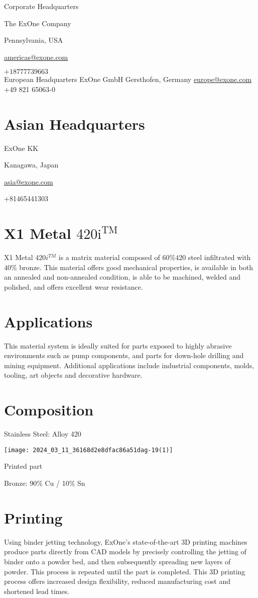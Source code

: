 \documentclass[10pt]{article}
\begin{document}
Corporate Headquarters

The ExOne Company

Pennsylvania, USA

\href{mailto:americas@exone.com}{americas@exone.com}

$+18777739663$\\
European Headquarters ExOne GmbH Gersthofen, Germany \href{mailto:europe@exone.com}{europe@exone.com} +49 821 65063-0

\section*{Asian Headquarters}
ExOne KK

Kanagawa, Japan

\href{mailto:asia@exone.com}{asia@exone.com}

+81465441303

\section*{X1 Metal $420 \mathrm{i}^{\mathrm{TM}}$}
X1 Metal $420 i^{T M}$ is a matrix material composed of $60 \% 420$ steel infiltrated with $40 \%$ bronze. This material offers good mechanical properties, is available in both an annealed and non-annealed condition, is able to be machined, welded and polished, and offers excellent wear resistance.

\section*{Applications}
This material system is ideally suited for parts exposed to highly abrasive environments such as pump components, and parts for down-hole drilling and mining equipment. Additional applications include industrial components, molds, tooling, art objects and decorative hardware.

\section*{Composition}
Stainless Steel: Alloy 420

\begin{center}
\texttt{[image: 2024\_03\_11\_36168d2e8dfac86a51dag-19(1)]}
\end{center}

Printed part

Bronze: $90 \%$ Cu / 10\% Sn

\section*{Printing}
Using binder jetting technology, ExOne's state-of-the-art 3D printing machines produce parts directly from CAD models by precisely controlling the jetting of binder onto a powder bed, and then subsequently spreading new layers of powder. This process is repeated until the part is completed. This 3D printing process offers increased design flexibility, reduced manufacturing cost and shortened lead times.
\end{document}
